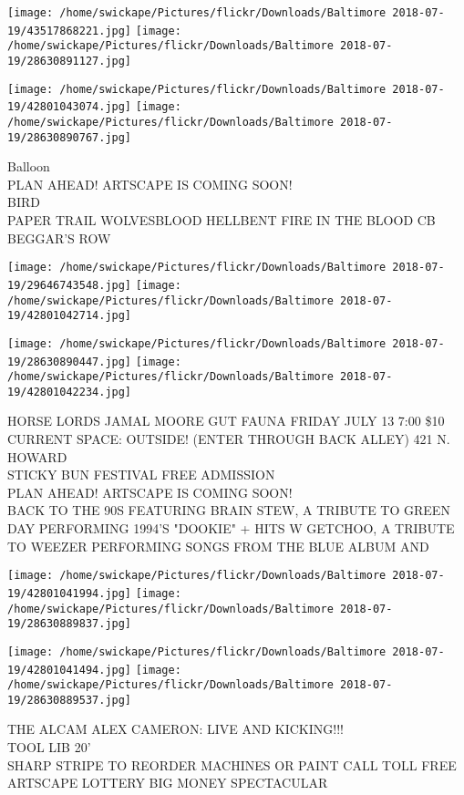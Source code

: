 \documentclass[10pt,letterpaper]{article}
\begin{document}
\texttt{[image: /home/swickape/Pictures/flickr/Downloads/Baltimore 2018-07-19/43517868221.jpg]}
\texttt{[image: /home/swickape/Pictures/flickr/Downloads/Baltimore 2018-07-19/28630891127.jpg]}

\texttt{[image: /home/swickape/Pictures/flickr/Downloads/Baltimore 2018-07-19/42801043074.jpg]}
\texttt{[image: /home/swickape/Pictures/flickr/Downloads/Baltimore 2018-07-19/28630890767.jpg]}

Balloon\\
PLAN AHEAD!  ARTSCAPE IS COMING SOON!\\
BIRD\\
PAPER TRAIL WOLVESBLOOD HELLBENT FIRE IN THE BLOOD CB BEGGAR'S ROW\\
\pagebreak

\texttt{[image: /home/swickape/Pictures/flickr/Downloads/Baltimore 2018-07-19/29646743548.jpg]}
\texttt{[image: /home/swickape/Pictures/flickr/Downloads/Baltimore 2018-07-19/42801042714.jpg]}

\texttt{[image: /home/swickape/Pictures/flickr/Downloads/Baltimore 2018-07-19/28630890447.jpg]}
\texttt{[image: /home/swickape/Pictures/flickr/Downloads/Baltimore 2018-07-19/42801042234.jpg]}

HORSE LORDS JAMAL MOORE GUT FAUNA FRIDAY JULY 13 7:00 \$10 CURRENT SPACE: OUTSIDE! (ENTER THROUGH BACK ALLEY) 421 N. HOWARD\\
STICKY BUN FESTIVAL FREE ADMISSION\\
PLAN AHEAD!  ARTSCAPE IS COMING SOON!\\
BACK TO THE 90S FEATURING BRAIN STEW, A TRIBUTE TO GREEN DAY PERFORMING 1994'S "DOOKIE" + HITS W GETCHOO, A TRIBUTE TO WEEZER PERFORMING SONGS FROM THE BLUE ALBUM AND\\
\pagebreak

\texttt{[image: /home/swickape/Pictures/flickr/Downloads/Baltimore 2018-07-19/42801041994.jpg]}
\texttt{[image: /home/swickape/Pictures/flickr/Downloads/Baltimore 2018-07-19/28630889837.jpg]}

\texttt{[image: /home/swickape/Pictures/flickr/Downloads/Baltimore 2018-07-19/42801041494.jpg]}
\texttt{[image: /home/swickape/Pictures/flickr/Downloads/Baltimore 2018-07-19/28630889537.jpg]}

THE ALCAM ALEX CAMERON: LIVE AND KICKING!!!\\
TOOL LIB 20'\\
SHARP STRIPE TO REORDER MACHINES OR PAINT CALL TOLL FREE\\
ARTSCAPE LOTTERY BIG MONEY SPECTACULAR\\
\pagebreak
\end{document}
